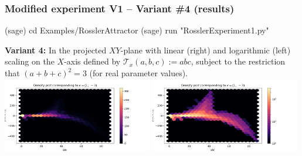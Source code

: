 \documentclass[usenames,svgnames,dvipsnames,10pt]{beamer}
\begin{document}
\begin{frame}[fragile]
\frametitle{Modified experiment V1 -- Variant \#4 (results)}

\begin{center}
\begin{code}
(sage) cd Examples/RosslerAttractor
(sage) run "RosslerExperiment1.py"
\end{code}
\textbf{Variant 4:} 
In the projected $XY$-plane with linear (right) and logarithmic (left) scaling on the $X$-axis defined by 
$\mathcal{T}_x(a, b, c) := abc$, subject to the restriction that 
$(a+b+c)^2 = 3$ (for real parameter values). \\ 
\includegraphics[width=0.49\textwidth]{../Images/RosslerAttractorExpt1-Variant4-linearscale-TypeXY-2021-10-27-040705.png}
\includegraphics[width=0.49\textwidth]{../Images/RosslerAttractorExpt1-Variant4-logscale-TypeXY-2021-10-27-035400.png}
\end{center}

\end{frame}
\end{document}
